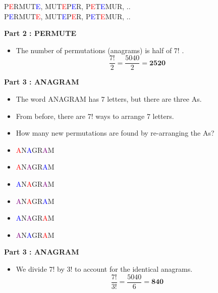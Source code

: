 \documentclass[12pt]{report}
\begin{document}
		\begin{center}
			P\textcolor{red}{E}RMUT\textcolor{blue}{E}, \; MUT\textcolor{red}{E}P\textcolor{blue}{E}R, \; P\textcolor{red}{E}T\textcolor{blue}{E}MUR,\; ..\\
			P\textcolor{blue}{E}RMUT\textcolor{red}{E}, \; MUT\textcolor{blue}{E}P\textcolor{red}{E}R, \; P\textcolor{blue}{E}T\textcolor{red}{E}MUR,\; ..
		\end{center}
		

		\textbf{Part 2 : PERMUTE}\\
		\begin{itemize}
			\item The number of permutations (anagrams) is half of 7! .
			\LARGE
			\[\frac{7!}{2} =  \frac{5040}{2} = \boldsymbol{2520} \]
		\end{itemize}
		
		
		\textbf{Part 3 : ANAGRAM}\\
		\begin{itemize}
			\item The word ANAGRAM has 7 letters, but there are three As.
			\item From before, there are 7! ways to arrange 7 letters.
			\item How many new permutations are found by re-arranging the As?
		\end{itemize}
		\LARGE
		\begin{itemize}
		\item	\textcolor{red}{A}N\textcolor{blue}{A}GR\textcolor{purple}{A}M 
	\item		\textcolor{red}{A}N\textcolor{purple}{A}GR\textcolor{blue}{A}M 
	\item 		\textcolor{blue}{A}N\textcolor{red}{A}GR\textcolor{purple}{A}M  \\
	\item		\textcolor{purple}{A}N\textcolor{red}{A}GR\textcolor{blue}{A}M 
		\item	\textcolor{blue}{A}N\textcolor{purple}{A}GR\textcolor{red}{A}M 
	\item		\textcolor{purple}{A}N\textcolor{blue}{A}GR\textcolor{red}{A}M 
		\end{itemize}

		\vspace{-0.1cm}
		\textbf{Part 3 : ANAGRAM}\\
		\begin{itemize}
			\item We divide 7! by 3! to account for the identical anagrams.
			\LARGE
			\[\frac{7!}{3!} =  \frac{5040}{6} = \boldsymbol{840} \]
		\end{itemize}
		
\end{document}
